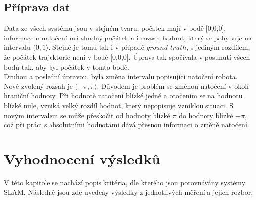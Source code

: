 \documentclass[12pt]{report}
\begin{document}
\subsection{Příprava dat}
Data ze všech systémů jsou v stejném tvaru, počátek mají v bodě [0,0,0], informace o natočení má shodný počátek a i rozsah hodnot, který se pohybuje na intervalu $(0,1\rangle$. Stejně je tomu tak i v případě $ground$ $truth$, s jediným rozdílem, že počátek trajektorie není v bodě [0,0,0]. Úprava tak spočívala v posunutí všech bodů tak, aby byl počátek v tomto bodě.\\
Druhou a poslední úpravou, byla změna intervalu popisující natočení robota. Nově zvolený rozsah je $(-\pi,\pi\rangle$. Důvodem je problém se změnou natočení v okolí hraniční hodnoty. Při hodnotě natočení blízké jedné a otočením se na hodnotu blízké nule, vzniká velký rozdíl hodnot, který nepopisuje vzniklou situaci. S novým intervalem se může přeskočit od hodnoty blízké $\pi$ do hodnoty blízké $-\pi$, což při práci s absolutními hodnotami dává přesnou informaci o změně natočení. 

\newpage

\section{Vyhodnocení výsledků}
V této kapitole se nachází popis kritéria, dle kterého jsou porovnávány systémy SLAM. Následně jsou zde uvedeny výsledky z jednotlivých měření a jejich rozbor. 
\end{document}
